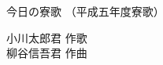 \documentclass[10pt,b5j]{tarticle} %
\begin{document}
\begin{minipage}[c]{0.7\hsize} %
    \begin{center}
        {\LARGE
            今日の寮歌 %
        }
        {\small 
            （平成五年度寮歌） %
        }
    \end{center}
\end{minipage}
\begin{minipage}[c]{0.3\hsize} %
    \begin{flushright} %
        小川太郎君 作歌\\柳谷信吾君 作曲 %
    \end{flushright}
\end{minipage}
\end{document}
